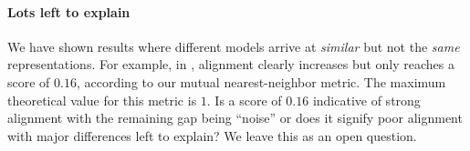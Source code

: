 \documentclass{article}
\newcommand{\bc}[1]{{\color{olive}BC: #1}}
\theoremstyle{plain}
\theoremstyle{definition}
\theoremstyle{remark}
\begin{document}

\paragraph{Lots left to explain} We have shown results where different models arrive at \textit{similar} but not the \textit{same} representations. For example, in , alignment clearly increases but only reaches a score of $0.16$, according to our  mutual nearest-neighbor metric. The maximum theoretical value for this metric is $1$. Is a score of $0.16$ indicative of strong alignment with the remaining gap being ``noise'' or does it signify poor alignment with major differences left to explain? We leave this as an open question.%


\end{document}
